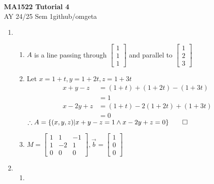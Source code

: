 \documentclass[12pt, a4paper]{article}
\newcommand{\mytitle}{MA1522 Tutorial 4}
\newcommand{\myauthor}{github/omgeta}
\newcommand{\mydate}{AY 24/25 Sem 1}
\begin{document}
\raggedright
\footnotesize
\begin{center}
{\normalsize{\textbf{\mytitle}}} \\
{\footnotesize{\mydate\hspace{2pt}\textemdash\hspace{2pt}\myauthor}}
\end{center}

\begin{enumerate}[Q\arabic*.]
  \item
    \begin{enumerate}[(\alph*)]
      \item $A$ is a line passing through $\begin{bmatrix}1\\1\\1\end{bmatrix}$ and parallel to $\begin{bmatrix}1\\2\\3\end{bmatrix}$
      \item Let $x=1+t, y=1+2t, z=1+3t$
        \begin{align*}
          x+y-z &= (1+t) + (1+2t) - (1+3t)\\
                &= 1\\
          x-2y+z &= (1+t) - 2(1+2t) + (1+3t)\\
                 &= 0
        \end{align*}
        $\therefore A = \{(x, y, z) | x + y - z = 1 \land x - 2y + z = 0\} \qed$
      \item $M = \begin{bmatrix}1&1&-1\\1&-2&1\\0&0&0\end{bmatrix}, \vec{b} = \begin{bmatrix}1\\0\\0\end{bmatrix}$
    \end{enumerate}
  \pagebreak
  \item 
    \begin{enumerate}[(\alph*)]
      \item 
        \begin{enumerate}[(\roman*)]

\end{enumerate}
\end{enumerate}
\end{enumerate}
\end{document}
